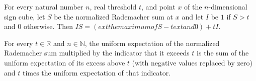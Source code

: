\begin{theorem}
\label{FABL.hammingUpperTailIndicator_mul_normalizedRademacherSum}
\leanok
{}
For every natural number $n$, real threshold $t$, and point $x$ of the $n$-dimensional
sign cube, let $S$ be the normalized Rademacher sum at $x$ and let $I$ be $1$ if $S>t$
and $0$ otherwise. Then $IS=(	ext{the maximum of }S-t	ext{ and }0)+tI$.
\end{theorem}

\begin{theorem}
\label{FABL.expect_hammingUpperTailIndicator_mul_normalizedRademacherSum}
\leanok
{}
For every $t\in\mathbb R$ and $n\in\mathbb N$, the uniform expectation of the normalized
Rademacher sum multiplied by the indicator that it exceeds $t$ is the sum of the uniform
expectation of its excess above $t$ (with negative values replaced by zero) and $t$
times the uniform expectation of that indicator.
\end{theorem}

